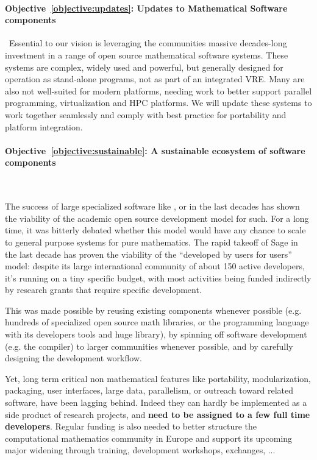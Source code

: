 \documentclass[noworkareas,deliverables,keys]{euproposal}                  %
\begin{document}
\begin{proposal}
\paragraph{Objective~\ref{objective:updates}: Updates to Mathematical
  Software components}\ 
Essential to our vision is leveraging the communities massive
decades-long investment in a range of open source mathematical
software systems. These systems are complex, widely used and powerful,
but generally designed for operation as stand-alone programs, not as
part of an integrated VRE. Many are also not well-suited for modern
platforms, needing work to better support parallel programming,
virtualization and HPC platforms. We will update these systems to work
together seamlessly and comply with best practice for portability and
platform integration.


\paragraph{Objective~\ref{objective:sustainable}: A sustainable
  ecosystem of software components}\ 

The success of large specialized software like \PariGP, \Singular or
\GAP in the last decades has shown the viability of the academic open
source development model for such. For a long time, it was bitterly
debated whether this model would have any chance to scale to general
purpose systems for pure mathematics. The rapid takeoff of Sage in the
last decade has proven the viability of the ``developed by users for
users'' model: despite its large international community of about 150
active developers, it's running on a tiny specific budget, with most
activities being funded indirectly by research grants that require
specific development.

This was made possible by reusing existing components whenever
possible (e.g. hundreds of specialized open source math libraries, or
the \Python programming language with its developers tools and huge
library), by spinning off software development (e.g. the \Cython
compiler) to larger communities whenever possible, and by carefully
designing the development workflow.

Yet, long term critical non mathematical features like portability,
modularization, packaging, user interfaces, large data, parallelism,
or outreach toward related software, have been lagging behind. Indeed
they can hardly be implemented as a side product of research projects,
and \textbf{need to be assigned to a few full time developers}. Regular
funding is also needed to better structure the computational
mathematics community in Europe and support its upcoming major
widening through training, development workshops, exchanges, ...


\end{proposal}
\end{document}
